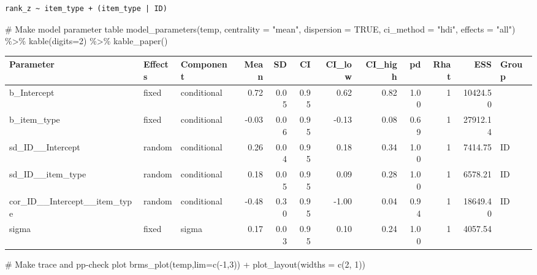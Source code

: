 \documentclass[
  letterpaper,
  DIV=11,
  numbers=noendperiod]{scrartcl}
\newenvironment{Shaded}{\begin{snugshade}}{\end{snugshade}}
\newcommand{\AttributeTok}[1]{\textcolor[rgb]{0.40,0.45,0.13}{#1}}
\newcommand{\CommentTok}[1]{\textcolor[rgb]{0.37,0.37,0.37}{#1}}
\newcommand{\ConstantTok}[1]{\textcolor[rgb]{0.56,0.35,0.01}{#1}}
\newcommand{\DecValTok}[1]{\textcolor[rgb]{0.68,0.00,0.00}{#1}}
\newcommand{\FunctionTok}[1]{\textcolor[rgb]{0.28,0.35,0.67}{#1}}
\newcommand{\NormalTok}[1]{\textcolor[rgb]{0.00,0.23,0.31}{#1}}
\newcommand{\SpecialCharTok}[1]{\textcolor[rgb]{0.37,0.37,0.37}{#1}}
\newcommand{\StringTok}[1]{\textcolor[rgb]{0.13,0.47,0.30}{#1}}
\begin{document}
\begin{verbatim}
rank_z ~ item_type + (item_type | ID) 
\end{verbatim}

\begin{Shaded}
\begin{Highlighting}[]
\CommentTok{\# Make model parameter table}
\FunctionTok{model\_parameters}\NormalTok{(temp, }\AttributeTok{centrality =} \StringTok{"mean"}\NormalTok{, }\AttributeTok{dispersion =} \ConstantTok{TRUE}\NormalTok{, }
                 \AttributeTok{ci\_method =} \StringTok{"hdi"}\NormalTok{, }\AttributeTok{effects =} \StringTok{"all"}\NormalTok{) }\SpecialCharTok{\%\textgreater{}\%} 
  \FunctionTok{kable}\NormalTok{(}\AttributeTok{digits=}\DecValTok{2}\NormalTok{) }\SpecialCharTok{\%\textgreater{}\%} \FunctionTok{kable\_paper}\NormalTok{()}
\end{Highlighting}
\end{Shaded}

\begin{longtable*}[t]{lllrrrrrrrrl}
\toprule
Parameter & Effects & Component & Mean & SD & CI & CI\_low & CI\_high & pd & Rhat & ESS & Group\\
\midrule
b\_Intercept & fixed & conditional & 0.72 & 0.05 & 0.95 & 0.62 & 0.82 & 1.00 & 1 & 10424.50 & \\
b\_item\_type & fixed & conditional & -0.03 & 0.06 & 0.95 & -0.13 & 0.08 & 0.69 & 1 & 27912.14 & \\
sd\_ID\_\_Intercept & random & conditional & 0.26 & 0.04 & 0.95 & 0.18 & 0.34 & 1.00 & 1 & 7414.75 & ID\\
sd\_ID\_\_item\_type & random & conditional & 0.18 & 0.05 & 0.95 & 0.09 & 0.28 & 1.00 & 1 & 6578.21 & ID\\
cor\_ID\_\_Intercept\_\_item\_type & random & conditional & -0.48 & 0.30 & 0.95 & -1.00 & 0.04 & 0.94 & 1 & 18649.40 & ID\\
\addlinespace
sigma & fixed & sigma & 0.17 & 0.03 & 0.95 & 0.10 & 0.24 & 1.00 & 1 & 4057.54 & \\
\bottomrule
\end{longtable*}

\begin{Shaded}
\begin{Highlighting}[]
\CommentTok{\# Make trace and pp{-}check plot}
\FunctionTok{brms\_plot}\NormalTok{(temp,}\AttributeTok{lim=}\FunctionTok{c}\NormalTok{(}\SpecialCharTok{{-}}\DecValTok{1}\NormalTok{,}\DecValTok{3}\NormalTok{))  }\SpecialCharTok{+} \FunctionTok{plot\_layout}\NormalTok{(}\AttributeTok{widths =} \FunctionTok{c}\NormalTok{(}\DecValTok{2}\NormalTok{, }\DecValTok{1}\NormalTok{))}
\end{Highlighting}
\end{Shaded}
\end{document}
